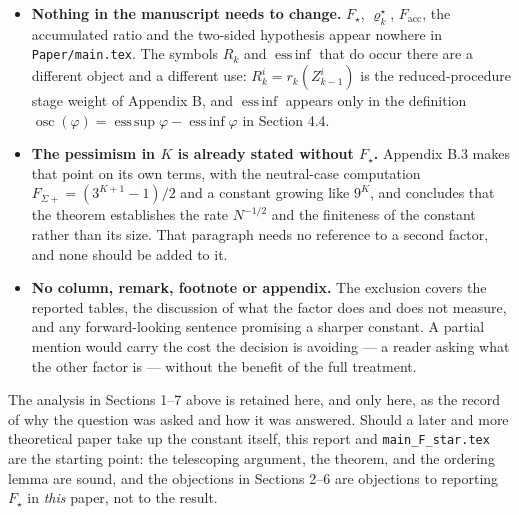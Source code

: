 \documentclass[11pt]{article}
\theoremstyle{plain}
\newcommand{\osc}{\operatorname{osc}}
\newcommand{\esssup}{\operatorname*{ess\,sup}}
\newcommand{\essinf}{\operatorname*{ess\,inf}}
\begin{document}
\begin{itemize}
    \item \textbf{Nothing in the manuscript needs to change.} $F_\star$,
    $\varrho^\star_k$, $F_{\mathrm{acc}}$, the accumulated ratio and the
    two-sided hypothesis appear nowhere in \texttt{Paper/main.tex}. The
    symbols $R_k$ and $\essinf$ that do occur there are a different object and
    a different use: $R_k^i=r_k(Z_{k-1}^i)$ is the reduced-procedure stage
    weight of Appendix B, and $\essinf$ appears only in the definition
    $\osc(\varphi)=\esssup\varphi-\essinf\varphi$ in Section 4.4.
    \item \textbf{The pessimism in $K$ is already stated without $F_\star$.}
    Appendix B.3 makes that point on its own terms, with the neutral-case
    computation $F_{\Sigma+}=(3^{K+1}-1)/2$ and a constant growing like
    $9^{K}$, and concludes that the theorem establishes the rate $N^{-1/2}$ and
    the finiteness of the constant rather than its size. That paragraph needs
    no reference to a second factor, and none should be added to it.
    \item \textbf{No column, remark, footnote or appendix.} The exclusion
    covers the reported tables, the discussion of what the factor does and does
    not measure, and any forward-looking sentence promising a sharper constant.
    A partial mention would carry the cost the decision is avoiding --- a
    reader asking what the other factor is --- without the benefit of the full
    treatment.
\end{itemize}

The analysis in Sections 1--7 above is retained here, and only here, as the
record of why the question was asked and how it was answered. Should a later
and more theoretical paper take up the constant itself, this report and
\texttt{main\_F\_star.tex} are the starting point: the telescoping argument,
the theorem, and the ordering lemma are sound, and the objections in
Sections 2--6 are objections to reporting $F_\star$ in \emph{this} paper, not
to the result.
\end{document}
